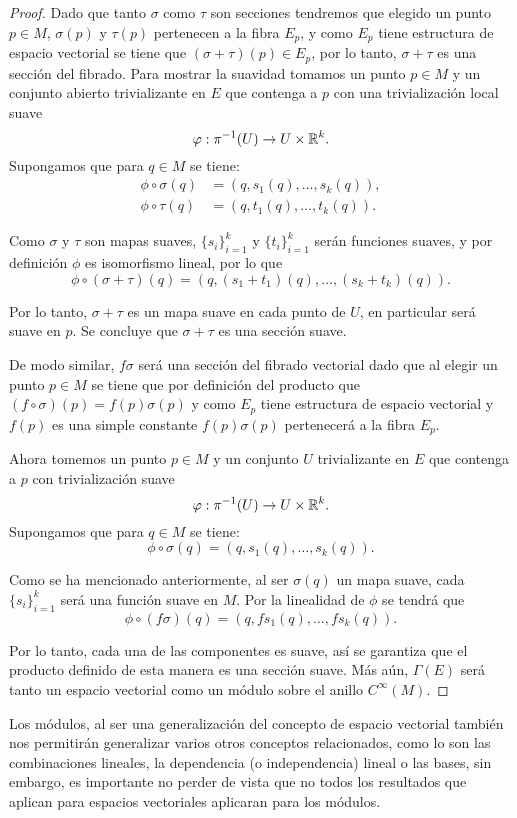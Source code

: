 \begin{proof}
	Dado que tanto $\sigma$ como $\tau$ son secciones tendremos que elegido un punto $p \in M$, $\sigma(p)$ y $\tau(p)$ pertenecen a la fibra $E_p$, y como $E_p$ tiene estructura de espacio vectorial se tiene que $(\sigma + \tau)(p) \in E_p$, por lo tanto, $\sigma + \tau$ es una sección del fibrado. Para mostrar la suavidad tomamos un punto $p \in M$ y un conjunto abierto trivializante en $E$ que contenga a $p$ con una trivialización local suave
	\[
		\varphi: \pi^{-1}(U) \to U \times \mathbb{R}^k.
	\]
	Supongamos que para $q \in M$ se tiene:
	\begin{align*}
		\phi \circ \sigma(q) & = (q, s_1(q), \dots, s_k(q)), \\
		\phi \circ \tau(q)   & = (q, t_1(q), \dots, t_k(q)).
	\end{align*}

	Como $\sigma$ y $\tau$ son mapas suaves, $\{s_i\}_{i=1}^k$ y  $\{t_i\}_{i=1}^k$ serán funciones suaves, y por definición $\phi$ es isomorfismo lineal, por lo que
	\[
		\phi \circ (\sigma + \tau)(q) = (q, (s_1 + t_1)(q), \dots, (s_k + t_k)(q)).
	\]

	Por lo tanto, $\sigma + \tau$ es un mapa suave en cada punto de $U$, en particular será suave en $p$. Se concluye que $\sigma + \tau$ es una sección suave.

	De modo similar, $f\sigma$ será una sección del fibrado vectorial dado que al elegir un punto $p \in M$ se tiene que por definición del producto que $(f \circ \sigma)(p) = f(p)\sigma(p)$ y como $E_p$ tiene estructura de espacio vectorial y $f(p)$ es una simple constante $f(p)\sigma(p)$ pertenecerá a la fibra $E_p$.

	Ahora tomemos un punto $p \in M$ y un conjunto $U$ trivializante en $E$ que contenga a $p$ con trivialización suave
	\[
		\varphi: \pi^{-1}(U) \to U \times \mathbb{R}^{k}.
	\]
	Supongamos que para $q \in M$ se tiene:
	\[
		\phi \circ \sigma(q) = (q, s_1(q), \dots, s_k(q)).
	\]

	Como se ha mencionado anteriormente, al ser $\sigma(q)$ un mapa suave, cada $\{s_i\}_{i=1}^k$ será una función suave en $M$. Por la linealidad de $\phi$ se tendrá que
	\[
		\phi \circ (f \sigma)(q) = (q, fs_1(q),\dots, fs_k(q)).
	\]

	Por lo tanto, cada una de las componentes es suave, así se garantiza que el producto definido de esta manera es una sección suave. Más aún, $\Gamma(E)$ será tanto un espacio vectorial como un módulo sobre el anillo $C^{\infty}(M)$.
\end{proof}

Los módulos, al ser una generalización del concepto de espacio vectorial también nos permitirán generalizar varios otros conceptos relacionados, como lo son las combinaciones lineales, la dependencia (o independencia) lineal o las bases, sin embargo, es importante no perder de vista que no todos los resultados que aplican para espacios vectoriales aplicaran para los módulos.
